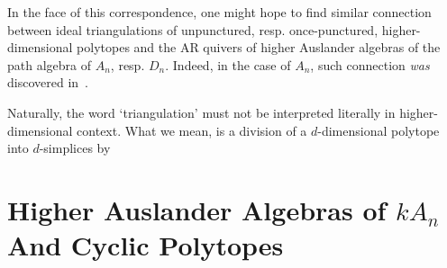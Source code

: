 \documentclass[a4paper,oneside,svgnames,draft]{amsart}
\theoremstyle{plain}
\theoremstyle{definition}
\begin{document}
 In the face of this correspondence, one might hope to find similar connection
 between ideal triangulations of unpunctured, resp. once-punctured,
 higher-dimensional polytopes and the AR quivers of higher Auslander algebras of
 the path algebra of $A_n$, resp. $D_n$. Indeed, in the case of $A_n$, such
 connection \emph{was} discovered in~\cite{ot}.

 Naturally, the word `triangulation' must not be interpreted literally in
 higher-dimensional context. What we mean, is a division of a $d$-dimensional
 polytope into $d$-simplices by 

 \section{Higher Auslander Algebras of $kA_n$ And Cyclic Polytopes}
 \label{sec:higher-auslander-algebras-of-kan-and-cyclic-polytopes}


 
\end{document}

